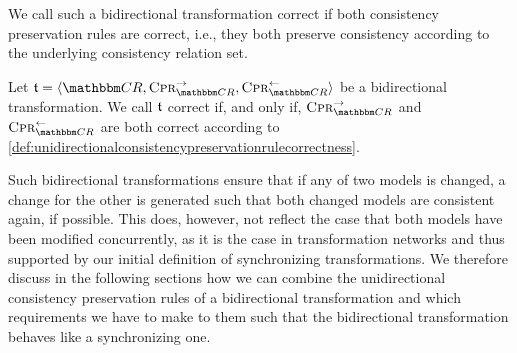 We call such a bidirectional transformation correct if both consistency preservation rules are correct, i.e., they both preserve consistency according to the underlying consistency relation set.

\begin{definition}
    \label{def:bidirectionaltransformationcorrectness}
    Let $\transformation{t} = \tupled{\consistencyrelationset{CR}, \consistencypreservationrule{\consistencyrelationset{CR}}^{\rightarrow}, \consistencypreservationrule{\consistencyrelationset{CR}}^{\leftarrow}}$ be a bidirectional transformation.
    We call $\mathfrak{t}$ correct if, and only if, $\consistencypreservationrule{\consistencyrelationset{CR}}^{\rightarrow}$ and $\consistencypreservationrule{\consistencyrelationset{CR}}^{\leftarrow}$ are both correct according to \autoref{def:unidirectionalconsistencypreservationrulecorrectness}.
\end{definition}

Such bidirectional transformations ensure that if any of two models is changed, a change for the other is generated such that both changed models are consistent again, if possible.
This does, however, not reflect the case that both models have been modified concurrently, as it is the case in transformation networks and thus supported by our initial definition of synchronizing transformations.
We therefore discuss in the following sections how we can combine the unidirectional consistency preservation rules of a bidirectional transformation and which requirements we have to make to them such that the bidirectional transformation behaves like a synchronizing one.


